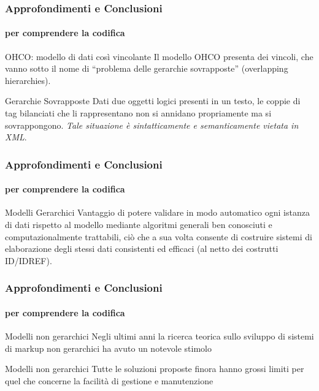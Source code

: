 \begin{frame}
	\frametitle{Approfondimenti e Conclusioni}
	\framesubtitle{per comprendere la codifica}
	\addtocounter{nframe}{1}

	\begin{block}{OHCO: modello di dati così vincolante}
		Il modello OHCO presenta dei vincoli, che vanno sotto il nome di ``problema delle gerarchie sovrapposte'' (overlapping hierarchies).
	 \end{block}
	 
	 \begin{block}{Gerarchie Sovrapposte}
		Dati due oggetti logici presenti in un testo, le coppie di tag bilanciati che li rappresentano non si annidano propriamente ma si sovrappongono. \textit{Tale situazione è sintatticamente e semanticamente vietata in XML}.
 	\end{block}
   
\end{frame}

\begin{frame}
	\frametitle{Approfondimenti e Conclusioni}
	\framesubtitle{per comprendere la codifica}
	\addtocounter{nframe}{1}

	\begin{block}{Modelli Gerarchici}
		Vantaggio di potere validare in modo automatico ogni istanza di dati rispetto al modello mediante algoritmi generali ben conosciuti e computazionalmente trattabili, ciò che a sua volta consente di costruire sistemi di elaborazione degli stessi dati consistenti ed efficaci (al netto dei costrutti ID/IDREF).
	 \end{block}
	 
   
\end{frame}

\begin{frame}
	\frametitle{Approfondimenti e Conclusioni}
	\framesubtitle{per comprendere la codifica}
	\addtocounter{nframe}{1}

	\begin{block}{Modelli non gerarchici}
		Negli ultimi anni la ricerca teorica sullo sviluppo di sistemi di markup non gerarchici ha avuto un notevole stimolo
	 \end{block}

	 \begin{block}{Modelli non gerarchici}
		Tutte le soluzioni proposte finora hanno grossi limiti per quel che concerne la facilità di gestione e manutenzione
	 \end{block}
	 
   
\end{frame}


